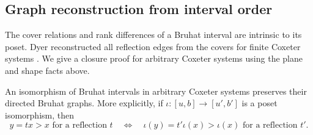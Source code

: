\subsection{Graph reconstruction from interval order}

The cover relations and rank differences of a Bruhat interval are intrinsic
to its poset. Dyer reconstructed all reflection edges from the covers for
finite Coxeter systems \cite[Proposition~3.3]{Dyer91}. We give a closure
proof for arbitrary Coxeter systems using the plane and shape facts above.

\begin{theorem}\label{bg:graph}
An isomorphism of Bruhat intervals in arbitrary Coxeter systems preserves
their directed Bruhat graphs. More explicitly, if
$\iota:[u,b]\longrightarrow[u',b']$ is a poset isomorphism, then
\[
 y=tx>x\text{ for a reflection }t
 \quad\Longleftrightarrow\quad
 \iota(y)=t'\iota(x)>\iota(x)\text{ for a reflection }t'.
\]
\end{theorem}

